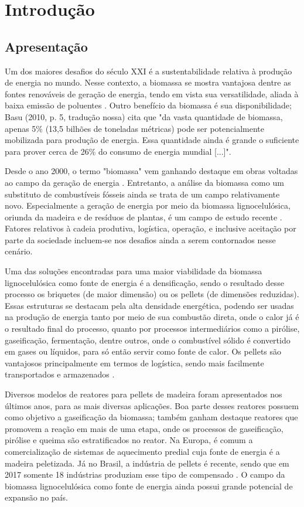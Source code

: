 
\chapter{Introdução}

\section{Apresentação}
Um dos maiores desafios do século XXI é a sustentabilidade relativa à produção de energia no mundo. Nesse contexto, a biomassa se mostra vantajosa dentre as fontes renováveis de geração de energia, tendo em vista sua versatilidade, aliada à baixa emissão de poluentes \cite{Nagafugi}. Outro benefício da biomassa é sua disponibilidade; Basu (2010, p. 5, tradução nossa) cita que "da vasta quantidade de biomassa, apenas 5\% (13,5 bilhões de toneladas métricas) pode ser potencialmente mobilizada para produção de energia. Essa quantidade ainda é grande o suficiente para prover cerca de 26\% do consumo de energia mundial [...]".

Desde o ano 2000, o termo "biomassa" vem ganhando destaque em obras voltadas ao campo da geração de energia \cite{Brand}. Entretanto, a análise da biomassa como um substituto de combustíveis fósseis ainda se trata de um campo relativamente novo. Especialmente a geração de energia por meio da biomassa lignocelulósica, oriunda da madeira e de resíduos de plantas, é um campo de estudo recente \cite{Boateng}. Fatores relativos à cadeia produtiva, logística, operação, e inclusive aceitação por parte da sociedade incluem-se nos desafios ainda a serem contornados nesse cenário.

Uma das soluções encontradas para uma maior viabilidade da biomassa lignocelulósica como fonte de energia é a densificação, sendo o resultado desse processo os briquetes (de maior dimensão) ou os pellets (de dimensões reduzidas). Essas estruturas se destacam pela alta densidade energética, podendo ser usadas na produção de energia tanto por meio de sua combustão direta, onde o calor já é o resultado final do processo, quanto por processos intermediários como a pirólise, gaseificação, fermentação, dentre outros, onde o combustível sólido é convertido em gases ou líquidos, para só então servir como fonte de calor. Os pellets são vantajosos principalmente em termos de logística, sendo mais facilmente transportados e armazenados \cite{Nagafugi}.

Diversos modelos de reatores para pellets de madeira foram apresentados nos últimos anos, para as mais diversas aplicações. Boa parte desses reatores possuem como objetivo a gaseificação da biomassa; também ganham destaque reatores que promovem a reação em mais de uma etapa, onde os processos de gaseificação, pirólise e queima são estratificados no reator. Na Europa, é comum a comercialização de sistemas de aquecimento predial cuja fonte de energia é a madeira peletizada. Já no Brasil, a indústria de pellets é recente, sendo que em 2017 somente 18 indústrias produziam esse tipo de compensado \cite{Sena2021}. O campo da biomassa lignocelulósica como fonte de energia ainda possui grande potencial de expansão no país.

